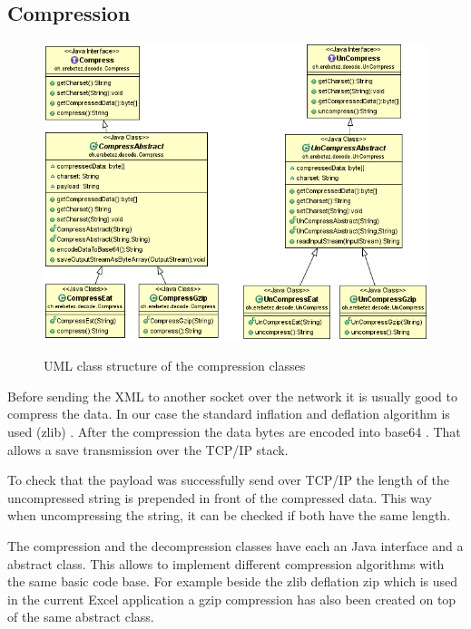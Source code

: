 \documentclass[paper=a4,twoside=false,BCOR=0mm,DIV=calc,fontsize=12pt]{scrartcl}
\begin{document}

\subsection{Compression}
\begin{figure}
    \begin{center}
      \includegraphics[width=1\textwidth]{./img/uml_decode_model.png}\\
    \end{center}
  \caption{UML class structure of the compression classes}
  \label{compressionClassUml}
\end{figure} 

Before sending the XML to another socket over the network it is usually good to compress the data.
In our case the standard inflation and deflation algorithm is used (zlib) \cite{zlib}. After the compression 
the data bytes are encoded into base64 \cite{base64}. That allows a save transmission over the TCP/IP stack.

To check that the payload was successfully send over TCP/IP the length of the uncompressed string is prepended in front of the compressed data. This way when uncompressing the string, it can be checked if both have the same length. 

The compression and the decompression classes have each an Java interface and a abstract class. This allows to implement different compression algorithms with the same basic code base. For example beside the zlib deflation zip which is used in the current Excel application a gzip compression has also been created on top of the same abstract class.
\end{document}
